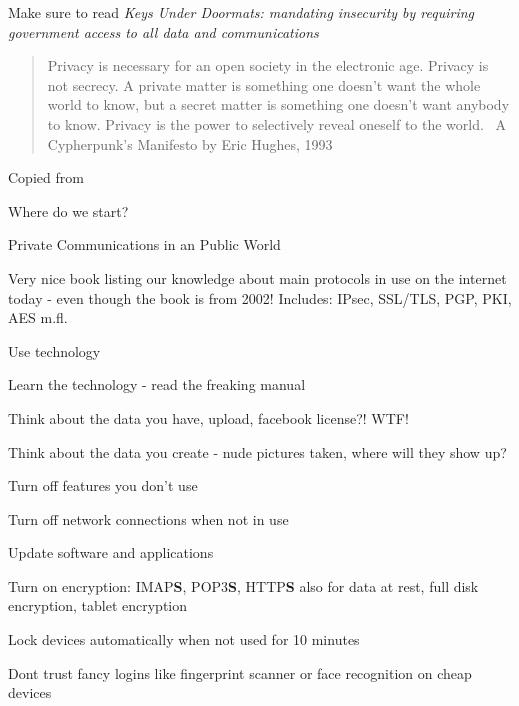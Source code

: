\documentclass[20pt,landscape,a4paper,footrule]{foils}
\begin{document}
Make sure to read \emph{Keys Under Doormats:
mandating insecurity by requiring government access to all data and communications}







\begin{quote}
	Privacy is necessary for an open society in the electronic age. Privacy is not secrecy. A private matter is something one doesn't want the whole world to know, but a secret matter is something one doesn't want anybody to know. Privacy is the power to selectively reveal oneself to the world. ~A Cypherpunk's Manifesto by Eric Hughes, 1993
\end{quote}

Copied from 


Where do we start?

\centerline{Private Communications in an Public World}

Very nice book listing our knowledge about main protocols in use on the internet today - even though the book is from 2002! Includes: IPsec, SSL/TLS, PGP, PKI, AES m.fl.


\begin{list1}
\item Use technology
\item Learn the technology - read the freaking manual
\item Think about the data you have, upload, facebook license?! WTF!
\item Think about the data you create - nude pictures taken, where will they show up?
\begin{list2}
\item Turn off features you don't use
\item Turn off network connections when not in use
\item Update software and applications
\item Turn on encryption: IMAP{\bf S}, POP3{\bf S},
  HTTP{\bf S} also for data at rest, full disk encryption, tablet encryption
\item Lock devices automatically when not used for 10 minutes
\item Dont trust fancy logins like fingerprint scanner or face recognition on cheap devices
\end{list2}
\end{list1}
\end{document}
